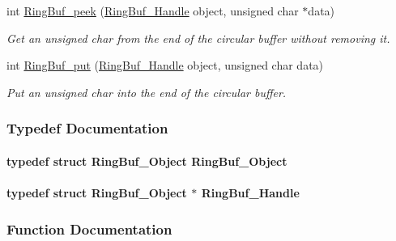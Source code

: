 \begin{DoxyCompactItemize}
int \hyperlink{_ring_buf_8h_ac71f61b4218cdf81fc8ff30b8e9f1bce}{Ring\+Buf\+\_\+peek} (\hyperlink{_ring_buf_8h_ade97ef8496bcec2a38a8695128458883}{Ring\+Buf\+\_\+\+Handle} object, unsigned char $\ast$data)
\begin{DoxyCompactList}\small\item\em Get an unsigned char from the end of the circular buffer without removing it. \end{DoxyCompactList}\item 
int \hyperlink{_ring_buf_8h_a7f2d2d83515194f08fcc7901481b5c62}{Ring\+Buf\+\_\+put} (\hyperlink{_ring_buf_8h_ade97ef8496bcec2a38a8695128458883}{Ring\+Buf\+\_\+\+Handle} object, unsigned char data)
\begin{DoxyCompactList}\small\item\em Put an unsigned char into the end of the circular buffer. \end{DoxyCompactList}\end{DoxyCompactItemize}


\subsubsection{Typedef Documentation}
\paragraph[{Ring\+Buf\+\_\+\+Object}]{\setlength{\rightskip}{0pt plus 5cm}typedef struct {\bf Ring\+Buf\+\_\+\+Object}  {\bf Ring\+Buf\+\_\+\+Object}}\label{_ring_buf_8h_af6920ef38868fbc57971fdbbab477d0d}
\paragraph[{Ring\+Buf\+\_\+\+Handle}]{\setlength{\rightskip}{0pt plus 5cm}typedef struct {\bf Ring\+Buf\+\_\+\+Object} $\ast$ {\bf Ring\+Buf\+\_\+\+Handle}}\label{_ring_buf_8h_ade97ef8496bcec2a38a8695128458883}


\subsubsection{Function Documentation}
